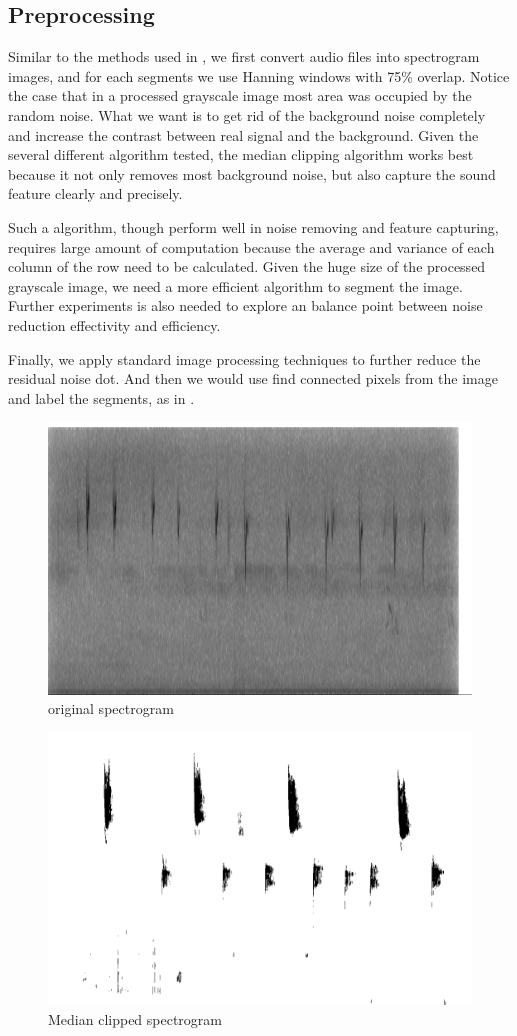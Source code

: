 \documentclass{article} %
\begin{document}
\subsection{Preprocessing}

Similar to the methods used in \cite{Lasseck13}, we first convert audio files into spectrogram images, and for each segments we use Hanning windows with 75\% overlap. Notice the case that in a processed grayscale image most area was occupied by the random noise. What we want is to get rid of the background noise completely and increase the contrast between real signal and the background. Given the several different algorithm tested, the median clipping algorithm \cite{mlsp1} works best because it not only removes most background noise, but also capture the sound feature clearly and precisely.

Such a algorithm, though perform well in noise removing and feature capturing, requires large amount of computation because the average and variance of each column of the row need to be calculated. Given the huge size of the processed grayscale image, we need a more efficient algorithm to segment the image. Further experiments is also needed to explore an balance point between noise reduction effectivity and efficiency.

Finally, we apply standard image processing techniques to further reduce the residual noise dot. And then we would use find connected pixels from the image and label the segments, as in \cite{Lasseck13}.

\begin{figure}[th!]
    \centering
    \includegraphics[width=0.8\linewidth, height=0.3\linewidth]{../Figure/Cropped}
     \centering
    \caption{original spectrogram}
    \label{fig:original}
\end{figure}

\begin{figure}[ht!]
    \centering
    \includegraphics[width=0.8\linewidth, height=0.3\linewidth]{../Figure/Median_clipped}
     \centering
    \caption{Median clipped spectrogram}
    \label{fig:Median_clipped}
\end{figure}
\end{document}
